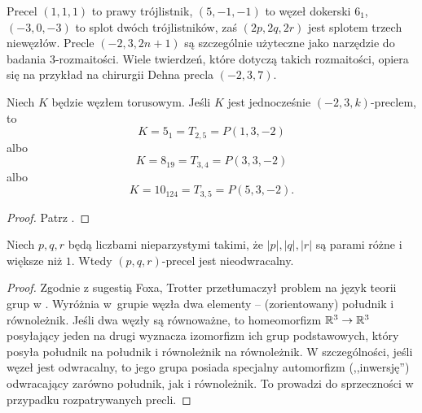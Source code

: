 Precel $(1,1,1)$ to prawy trójlistnik, $(5, -1, -1)$ to węzeł dokerski $6_1$, $(-3, 0, -3)$ to splot dwóch trójlistników, zaś $(2p, 2q, 2r)$ jest splotem trzech niewęzłów.
Precle $(-2, 3, 2n+1)$ są szczególnie użyteczne jako narzędzie do badania 3-rozmaitości.
Wiele twierdzeń, które dotyczą takich rozmaitości, opiera się na przykład na chirurgii Dehna precla $(-2, 3, 7)$.

\begin{proposition}
%
    Niech $K$ będzie węzłem torusowym.
    Jeśli $K$ jest jednocześnie $(-2, 3, k)$-preclem, to
    \begin{equation}
        K = 5_{1} = T_{2,5} = P(1, 3, -2)
    \end{equation}
    albo
    \begin{equation}
        K = 8_{19} = T_{3,4} = P(3, 3, -2)
    \end{equation}
    albo
    \begin{equation}
        K = 10_{124} = T_{3,5} = P(5, 3, -2).
    \end{equation}
\end{proposition}

\begin{proof}
    Patrz \cite{garoufalidis12}.
\end{proof}

\begin{proposition}
    \label{prp:pretzel_not_invertible}
    Niech $p, q, r$ będą liczbami nieparzystymi takimi, że $|p|, |q|, |r|$ są parami różne i większe niż $1$.
    Wtedy $(p, q, r)$-precel jest nieodwracalny.
\end{proposition}

\begin{proof}
%
%
    Zgodnie z sugestią Foxa, Trotter przetłumaczył problem na język teorii grup w \cite{trotter63}.
    Wyróżnia w~grupie węzła dwa elementy -- (zorientowany) południk i równoleżnik.
    Jeśli dwa węzły są równoważne, to homeomorfizm $\mathbb R^3 \to \mathbb R^3$ posyłający jeden na drugi wyznacza izomorfizm ich grup podstawowych, który posyła południk na południk i równoleżnik na równoleżnik.
    W szczególności, jeśli węzeł jest odwracalny, to jego grupa posiada specjalny automorfizm (,,inwersję'') odwracający zarówno południk, jak i równoleżnik.
    To prowadzi do sprzeczności w przypadku rozpatrywanych precli.
\end{proof}

